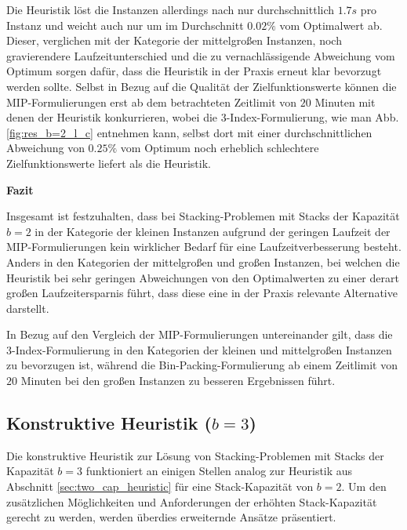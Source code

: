 Die Heuristik löst die Instanzen allerdings nach nur durchschnittlich $1.7s$ pro Instanz und weicht auch nur um im Durchschnitt $0.02 \%$ vom Optimalwert ab. Dieser, verglichen mit der Kategorie der mittelgroßen Instanzen, noch gravierendere Laufzeitunterschied und die zu vernachlässigende Abweichung vom Optimum sorgen dafür, dass die Heuristik in der Praxis erneut klar bevorzugt werden sollte. Selbst in Bezug auf die Qualität der Zielfunktionswerte können die MIP-Formulierungen erst ab dem betrachteten Zeitlimit von $20$ Minuten mit denen der Heuristik konkurrieren, wobei die 3-Index-Formulierung, wie man Abb. \ref{fig:res_b=2_l_c} entnehmen kann, selbst dort mit einer durchschnittlichen Abweichung von $0.25 \%$ vom Optimum noch erheblich schlechtere Zielfunktionswerte liefert als die Heuristik.\newline

\textbf{Fazit}

Insgesamt ist festzuhalten, dass bei Stacking-Problemen mit Stacks der Kapazität $b = 2$ in der Kategorie der kleinen Instanzen aufgrund der geringen Laufzeit der MIP-Formulierungen kein wirklicher Bedarf für eine Laufzeitverbesserung besteht. Anders in den Kategorien der mittelgroßen und großen Instanzen, bei welchen die Heuristik bei sehr geringen Abweichungen von den Optimalwerten zu einer derart großen Laufzeitersparnis führt, dass diese eine in der Praxis relevante Alternative darstellt.

In Bezug auf den Vergleich der MIP-Formulierungen untereinander gilt, dass die 3-Index-Formulierung in den Kategorien
der kleinen und mittelgroßen Instanzen zu bevorzugen ist, während die Bin-Packing-Formulierung ab einem Zeitlimit
von $20$ Minuten bei den großen Instanzen zu besseren Ergebnissen führt.

\vfill
\pagebreak

\subsection{Konstruktive Heuristik ($b = 3$)}
\label{sec:three_cap_heuristic}

Die konstruktive Heuristik zur Lösung von Stacking-Problemen mit Stacks der Kapazität $b = 3$ funktioniert
an einigen Stellen analog zur Heuristik aus Abschnitt \ref{sec:two_cap_heuristic} für eine Stack-Kapazität von $b = 2$.
Um den zusätzlichen Möglichkeiten und Anforderungen der erhöhten Stack-Kapazität gerecht zu werden, werden überdies
erweiternde Ansätze präsentiert.

